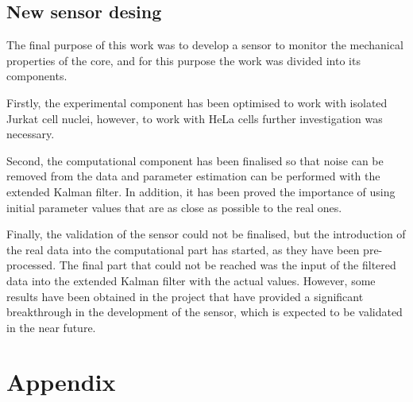 \documentclass[12pt, a4paper]{article} %
\begin{document}
\setlength{\parskip}{0mm}

\subsection{New sensor desing}

The final purpose of this work was to develop a sensor to monitor the mechanical properties of the core, and for this purpose the work was divided into its components. 

\setlength{\parskip}{4mm}

Firstly, the experimental component has been optimised to work with isolated Jurkat cell nuclei, however, to work with HeLa cells further investigation was necessary.

Second, the computational component has been finalised so that noise can be removed from the data and parameter estimation can be performed with the extended Kalman filter. In addition, it has been proved the importance of using initial parameter values that are as close as possible to the real ones.

Finally, the validation of the sensor could not be finalised, but the introduction of the real data into the computational part has started, as they have been pre-processed. The final part that could not be reached was the input of the filtered data into the extended Kalman filter with the actual values. However, some results have been obtained in the project that have provided a significant breakthrough in the development of the sensor, which is expected to be validated in the near future.

\newpage
\setlength{\parskip}{0mm}

\pagestyle{empty}



\newpage
\setlength{\parskip}{0mm}
\section{Appendix}
\end{document}
